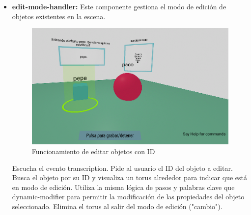 \documentclass[a4paper, 12pt]{book}
\begin{document}
\begin{itemize}
  \item \textbf{edit-mode-handler:} Este componente gestiona el modo de edición de objetos existentes en la escena.
  \begin{figure}[H]  %
    \centering
    \includegraphics[width=0.8\linewidth]{img/generador_funcional_completo_editar.png}  %
    \caption{Funcionamiento de editar objetos con ID}  %
    \label{fig:editarObj}  %
  \end{figure} 
  Escucha el evento transcription.
  Pide al usuario el ID del objeto a editar.
  Busca el objeto por su ID y visualiza un torus alrededor para indicar que está en modo de edición.
  Utiliza la misma lógica de pasos y palabras clave que dynamic-modifier para permitir la modificación de las propiedades del objeto seleccionado.
  Elimina el torus al salir del modo de edición ("cambio").



\end{itemize}
\end{document}
